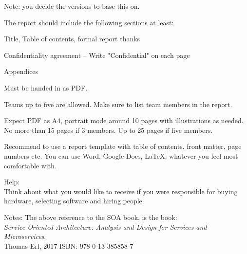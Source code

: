 \documentclass[a4paper,11pt,notitlepage]{report}
\begin{document}
Note: you decide the versions to base this on.

The report should include the following sections at least:
\begin{list2}
\item Title, Table of contents, formal report thanks
\item Confidentiality agreement -- Write "Confidential" on each page
\item Appendices
\end{list2}


Must be handed in as PDF.

Teams up to five are allowed. Make sure to list team members in the report.

Expect PDF as A4, portrait mode around 10 pages with illustrations as needed.
No more than 15 pages if 3 members. Up to 25 pages if five members.

Recommend to use a report template with table of contents, front matter, page numbers etc. You can use Word, Google Docs, LaTeX, whatever you feel most comfortable with.


Help:\\
Think about what you would like to receive if you were responsible for buying hardware, selecting software and hiring people.

Notes: The above reference to the SOA book, is the book:\\
\emph{Service-Oriented Architecture: Analysis and Design for Services and Microservices},\\ Thomas Erl, 2017
ISBN: 978-0-13-385858-7
\end{document}
